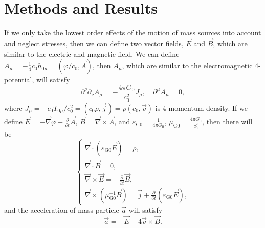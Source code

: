 \documentclass{article}
\def\p{\partial}
\begin{document}
\section{Methods and Results}

If we only take the lowest order effects of the motion of mass sources into account and neglect stresses, then we can define two vector fields, $\vec{E}$ and $\vec{B}$, which are similar to the electric and magnetic field. We can define $A_\mu=-\frac{1}{4}c_0\bar{h}_{0 \mu}=(\varphi/c_0,\vec{A})$, then $A_\mu$, which are similar to the electromagnetic 4-potential, will satisfy
\begin{equation}
    \p^\nu\p_\nu A_\mu=-\frac{4\pi G_0}{c_0^2}J_\mu,\quad\p^\mu A_\mu=0,
\end{equation}
where $J_\mu=-c_0T_{0 \mu}/c_0^2=(c_0\rho,\vec{j})=\rho(c_0,\vec{v})$ is 4-momentum density. If we define $\vec{E}=-\vec{\nabla}\varphi-\frac{\p}{\p t}\vec{A}$, $\vec{B}=\vec{\nabla}\times\vec{A}$, and $\varepsilon_{\text{G}0}=\frac{1}{4\pi G_0}$, $\mu_{\text{G}0}=\frac{4\pi G_0}{c_0^2}$, then there will be
\begin{equation}\label{maxwell_0}
    \begin{cases}
        \vec{\nabla}\cdot(\varepsilon_{\text{G}0}\vec{E})=\rho,\\
        \vec{\nabla}\cdot\vec{B}=0,\\
        \vec{\nabla}\times\vec{E}=-\frac{\p}{\p t}\vec{B},\\
        \vec{\nabla}\times(\mu_{\text{G}0}^{-1}\vec{B})=\vec{j}+\frac{\p}{\p t}(\varepsilon_{\text{G}0}\vec{E}),
    \end{cases}
\end{equation}
and the acceleration of mass particle $\vec{a}$ will satisfy
\begin{equation}\label{lorentz}
    \vec{a}=-\vec{E}-4\vec{v}\times\vec{B}.
\end{equation}
\end{document}
